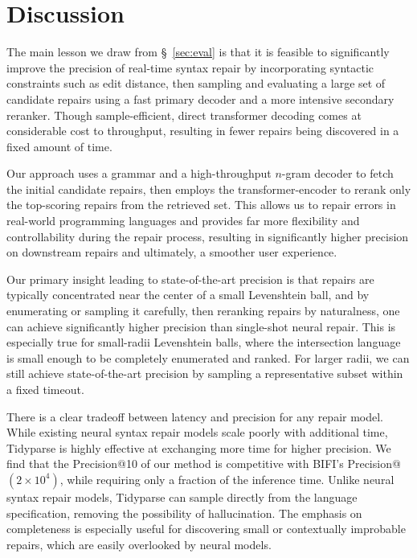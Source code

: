 \documentclass[popl.tex]{subfiles}
\begin{document}
\clearpage\section{Discussion}\label{sec:discussion}

The main lesson we draw from \S~\ref{sec:eval} is that it is feasible to significantly improve the precision of real-time syntax repair by incorporating syntactic constraints such as edit distance, then sampling and evaluating a large set of candidate repairs using a fast primary decoder and a more intensive secondary reranker. Though sample-efficient, direct transformer decoding comes at considerable cost to throughput, resulting in fewer repairs being discovered in a fixed amount of time.

Our approach uses a grammar and a high-throughput $n$-gram decoder to fetch the initial candidate repairs, then employs the transformer-encoder to rerank only the top-scoring repairs from the retrieved set. This allows us to repair errors in real-world programming languages and provides far more flexibility and controllability during the repair process, resulting in significantly higher precision on downstream repairs and ultimately, a smoother user experience.

Our primary insight leading to state-of-the-art precision is that repairs are typically concentrated near the center of a small Levenshtein ball, and by enumerating or sampling it carefully, then reranking repairs by naturalness, one can achieve significantly higher precision than single-shot neural repair. This is especially true for small-radii Levenshtein balls, where the intersection language is small enough to be completely enumerated and ranked. For larger radii, we can still achieve state-of-the-art precision by sampling a representative subset within a fixed timeout.

There is a clear tradeoff between latency and precision for any repair model. While existing neural syntax repair models scale poorly with additional time, Tidyparse is highly effective at exchanging more time for higher precision. We find that the Precision@10 of our method is competitive with BIFI's Precision@$(2\times 10^4)$, while requiring only a fraction of the inference time. Unlike neural syntax repair models, Tidyparse can sample directly from the language specification, removing the possibility of hallucination. The emphasis on completeness is especially useful for discovering small or contextually improbable repairs, which are easily overlooked by neural models.
\end{document}
